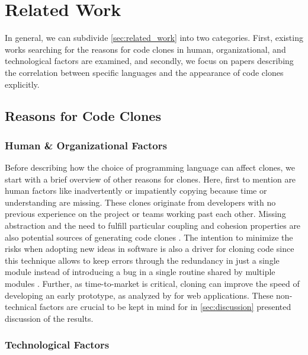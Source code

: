 
\section{Related Work}
\label{sec:related_work}

In general, we can subdivide \autoref{sec:related_work} into two categories. First, existing works searching for the reasons for code clones in human, organizational, and technological factors are examined, and secondly, we focus on papers describing the correlation between specific languages and the appearance of code clones explicitly.

\subsection{Reasons for Code Clones}
\label{sec:reasons_for_code_clones}

\subsubsection{Human \& Organizational Factors}

Before describing how the choice of programming language can affect clones, we start with a brief overview of other reasons for clones. Here, first to mention are human factors like inadvertently or impatiently copying because time or understanding are missing.
These clones originate from developers with no previous experience on the project or teams working past each other.
Missing abstraction and the need to fulfill particular coupling and cohesion properties are also potential sources of generating code clones  \cite{kasper2006cloning}.
The intention to minimize the risks when adopting new ideas in software is also a driver for cloning code since this technique allows to keep errors through the redundancy in just a single module instead of introducing a bug in a single routine shared by multiple modules \cite{cordy2003comprehending}. Further, as time-to-market is critical, cloning can improve the speed of developing an early prototype, as analyzed by \cite{rajapakse2007using} for web applications.
These non-technical factors are crucial to be kept in mind for in \autoref{sec:discussion} presented discussion of the results.


\subsubsection{Technological Factors}

